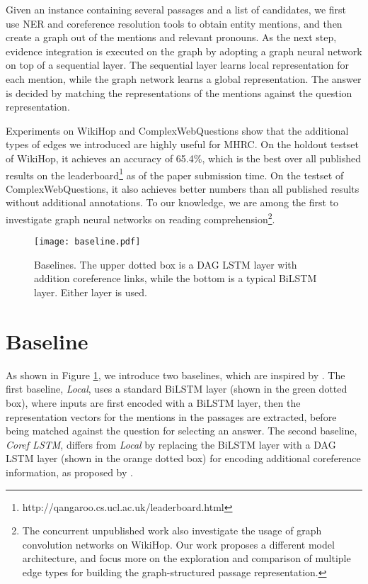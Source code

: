 \documentclass[letterpaper]{article}
\begin{document}
Given an instance containing several passages and a list of candidates, we first use NER and coreference resolution tools to obtain entity mentions, and then create a graph out of the mentions and relevant pronouns.
As the next step, evidence integration is executed on the graph by adopting a graph neural network on top of a sequential layer.
The sequential layer learns local representation for each mention, while the graph network learns a global representation.
The answer is decided by matching the representations of the mentions against the question representation.


Experiments on WikiHop \citep{welbl2018constructing} and ComplexWebQuestions \citep{N18-1059} show that the additional types of edges we introduced are highly useful for MHRC.
On the holdout testset of WikiHop, it achieves an accuracy of 65.4\%, which is the best over all published results on the leaderboard\footnote{http://qangaroo.cs.ucl.ac.uk/leaderboard.html} as of the paper submission time.
On the testset of ComplexWebQuestions, it also achieves better numbers than all published results without additional annotations.
To our knowledge, we are 
among 
the first to investigate graph neural networks on reading comprehension\footnote{The concurrent unpublished work \cite{gcnwiki} also investigate the usage of graph convolution networks on WikiHop. Our work proposes a different model architecture, and focus more on the exploration and comparison of multiple edge types for building the graph-structured passage representation.}.



\begin{figure}
\centering
\texttt{[image: baseline.pdf]}
\vspace{-0.5em}
\caption{Baselines. The upper dotted box is a DAG LSTM layer with addition coreference links, while the bottom is a typical BiLSTM layer. Either layer is used.}
\label{fig:baseline}
\vspace{-1.0em}
\end{figure}


\section{Baseline}

As shown in Figure \ref{fig:baseline}, we introduce two baselines, which are inspired by \citet{N18-2007}.
The first baseline, \emph{Local}, uses a standard BiLSTM layer (shown in the green dotted box), where inputs are first encoded with a BiLSTM layer, then the representation vectors for the mentions in the passages are extracted, before being matched against the question for selecting an answer.
The second baseline, \emph{Coref LSTM}, differs from \emph{Local} by replacing the BiLSTM layer with a DAG LSTM layer (shown in the orange dotted box) for encoding additional coreference information, as proposed by \citet{N18-2007}.
\end{document}
